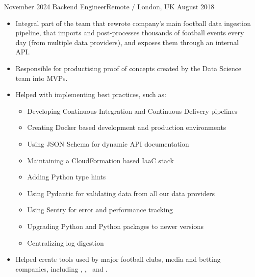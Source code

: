 \documentclass[localFont,alternative,10pt]{yaac-another-awesome-cv}
\begin{document}
  \begin{experiences}
    \experience
      {November 2024} {Backend Engineer}{}{Remote / London, UK}
      {August 2018}   {
                        \begin{itemize}
                          \item Integral part of the team that rewrote company's main football data ingestion pipeline, that imports and post-processes thousands of football events every day (from multiple data providers), and exposes them through an internal API.
                          \item Responsible for productising proof of concepts created by the Data Science team into MVPs.
                          \item Helped with implementing best practices, such as:
                            \begin{itemize}
                              \item Developing Continuous Integration and Continuous Delivery pipelines
                              \item Creating Docker based development and production environments
                              \item Using JSON Schema for dynamic API documentation
                              \item Maintaining a CloudFormation based IaaC stack
                              \item Adding Python type hints
                              \item Using Pydantic for validating data from all our data providers
                              \item Using Sentry for error and performance tracking
                              \item Upgrading Python and Python packages to newer versions
                              \item Centralizing log digestion
                            \end{itemize}
                          \item Helped create tools used by major football clubs, media and betting companies, including , , ~and .
                        \end{itemize}
                      }

\end{experiences}
\end{document}
